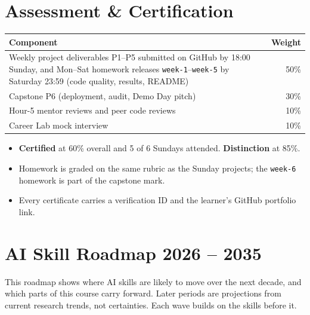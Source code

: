 \documentclass[11pt,a4paper]{article}
\begin{document}
\section{Assessment \& Certification}\label{sec:assess}
\begin{tabularx}{\linewidth}{@{}Y r@{}}
\toprule
\sffamily\bfseries Component & \sffamily\bfseries Weight\\
\midrule
Weekly project deliverables P1--P5 submitted on GitHub by 18:00 Sunday, and Mon--Sat homework releases \texttt{week-1}--\texttt{week-5} by Saturday 23:59 (code quality, results, README) & 50\%\\
Capstone P6 (deployment, audit, Demo Day pitch) & 30\%\\
Hour-5 mentor reviews and peer code reviews & 10\%\\
Career Lab mock interview & 10\%\\
\bottomrule
\end{tabularx}
\begin{itemize}
  \item \textbf{Certified} at 60\% overall and 5 of 6 Sundays attended. \textbf{Distinction} at 85\%.
  \item Homework is graded on the same rubric as the Sunday projects; the \texttt{week-6} homework is part of the capstone mark.
  \item Every certificate carries a verification ID and the learner's GitHub portfolio link.
\end{itemize}

\section{AI Skill Roadmap 2026 -- 2035}
This roadmap shows where AI skills are likely to move over the next decade, and which parts of this course carry forward. Later periods are projections from current research trends, not certainties. Each wave builds on the skills before it.

\vspace{4pt}
\begin{center}
\end{center}
\end{document}
